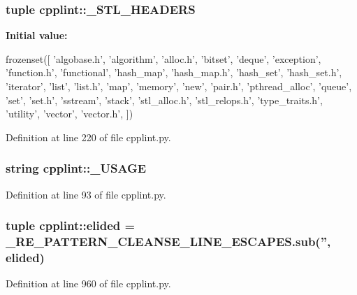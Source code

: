 \hypertarget{namespacecpplint_a76f8ec9e9e1ea46197f611bd5a995962}{
\subsubsection[{\_\-STL\_\-HEADERS}]{\setlength{\rightskip}{0pt plus 5cm}tuple {\bf cpplint::\_\-STL\_\-HEADERS}}}
\label{namespacecpplint_a76f8ec9e9e1ea46197f611bd5a995962}
{\bfseries Initial value:}
\begin{DoxyCode}
frozenset([
    'algobase.h', 'algorithm', 'alloc.h', 'bitset', 'deque', 'exception',
    'function.h', 'functional', 'hash_map', 'hash_map.h', 'hash_set',
    'hash_set.h', 'iterator', 'list', 'list.h', 'map', 'memory', 'new',
    'pair.h', 'pthread_alloc', 'queue', 'set', 'set.h', 'sstream', 'stack',
    'stl_alloc.h', 'stl_relops.h', 'type_traits.h',
    'utility', 'vector', 'vector.h',
    ])
\end{DoxyCode}


Definition at line 220 of file cpplint.py.

\hypertarget{namespacecpplint_afefe1ab8eeab7350e1a7d96d41c86fb8}{
\subsubsection[{\_\-USAGE}]{\setlength{\rightskip}{0pt plus 5cm}string {\bf cpplint::\_\-USAGE}}}
\label{namespacecpplint_afefe1ab8eeab7350e1a7d96d41c86fb8}


Definition at line 93 of file cpplint.py.

\hypertarget{namespacecpplint_a8559d5bdf881337b323a7253a71a5fed}{
\subsubsection[{elided}]{\setlength{\rightskip}{0pt plus 5cm}tuple {\bf cpplint::elided} = \_\-RE\_\-PATTERN\_\-CLEANSE\_\-LINE\_\-ESCAPES.sub('', {\bf elided})}}
\label{namespacecpplint_a8559d5bdf881337b323a7253a71a5fed}


Definition at line 960 of file cpplint.py.

